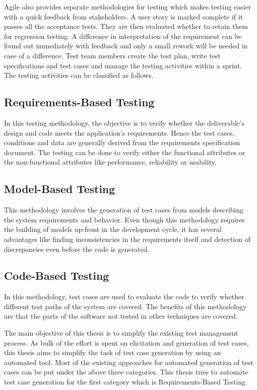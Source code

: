 Agile also provides separate methodologies for testing which makes testing easier with a quick feedback from stakeholders. A user story is marked complete if it passes all the acceptance tests. They are then evaluated whether to retain them for regression testing. A difference in interpretation of the requirement can be found out immediately with feedback and only a small rework will be needed in case of a difference. Test team members create the test plan, write test specifications and test cases and manage the testing activities within a sprint. The testing activities can be classified as follows.

\subsection{Requirements-Based Testing}
In this testing methodology, the objective is to verify whether the deliverable’s design and code meets the application’s requirements. Hence the test cases, conditions and data are generally derived from the requirements specification document. The testing can be done to verify either the functional attributes or the non-functional attributes like performance, reliability or usability. \cite{tahat2001requirement}

\subsection{Model-Based Testing}
This methodology involves the generation of test cases from models describing the system requirements and behavior. Even though this methodology requires the building of models up-front in the development cycle, it has several advantages like finding inconsistencies in the requirements itself and detection of discrepancies even before the code is generated. \cite{dias2007survey}

\subsection{Code-Based Testing}
In this methodology, test cases are used to evaluate the code to verify whether different test paths of the system are covered. The benefits of this methodology are that the parts of the software not tested in other techniques are covered. \cite{prasanna2005survey}

The main objective of this thesis is to simplify the existing test management process. As bulk of the effort is spent on elicitation and generation of test cases, this thesis aims to simplify the task of test case generation by using an automated tool. Most of the existing approaches for automated generation of test cases can be put under the above three categories. This thesis tries to automate test case generation for the first category which is Requirements-Based Testing.


